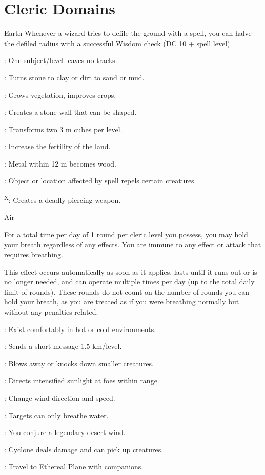 \section{Cleric Domains}

{Earth}
{Whenever a wizard tries to defile the ground with a spell, you can halve the defiled radius with a successful Wisdom check (DC 10 + spell level).}
{
	\item {}: One subject/level leaves no tracks.
	\item {}: Turns stone to clay or dirt to sand or mud.
	\item {}: Grows vegetation, improves crops.
	\item {}: Creates a stone wall that can be shaped.
	\item {}: Transforms two 3 m cubes per level.
	\item {}: Increase the fertility of the land.
	\item {}: Metal within 12 m becomes wood.
	\item {}: Object or location affected by spell repels certain creatures.
	\item {}\textsuperscript{X}: Creates a deadly piercing weapon.
}

{Air}
{For a total time per day of 1 round per cleric level you possess, you may hold your breath regardless of any effects. You are immune to any effect or attack that requires breathing.

This effect occurs automatically as soon as it applies, lasts until it runs out or is no longer needed, and can operate multiple times per day (up to the total daily limit of rounds). These rounds do not count on the number of rounds you can hold your breath, as you are treated as if you were breathing normally but without any penalties related.}
{
	\item {}: Exist comfortably in hot or cold environments.
	\item {}: Sends a short message 1.5 km/level.
	\item {}: Blows away or knocks down smaller creatures.
	\item {}: Directs intensified sunlight at foes within range.
	\item {}: Change wind direction and speed.
	\item {}: Targets can only breathe water.
	\item {}: You conjure a legendary desert wind.
	\item {}: Cyclone deals damage and can pick up creatures.
	\item {}: Travel to Ethereal Plane with companions.
}

